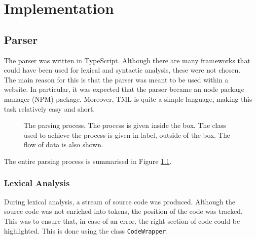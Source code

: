 \chapter{Implementation}
\section{Parser}

The parser was written in TypeScript. Although there are many frameworks that could have been used for lexical and syntactic analysis, these were not chosen. The main reason for this is that the parser was meant to be used within a website. In particular, it was expected that the parser became an node package manager (NPM) package. Moreover, TML is quite a simple language, making this task relatively easy and short.

\begin{figure}[htb]
    \centering
    \caption{The parsing process. The process is given inside the box. The class used to achieve the process is given in label, outside of the box. The flow of data is also shown.}
    \label{fig:parsing_process}
\end{figure}

The entire parsing process is summarised in Figure \ref{fig:parsing_process}.


\subsection{Lexical Analysis}

During lexical analysis, a stream of source code was produced. Although the source code was not enriched into tokens, the position of the code was tracked. This was to ensure that, in case of an error, the right section of code could be highlighted. This is done using the class \texttt{CodeWrapper}. 

